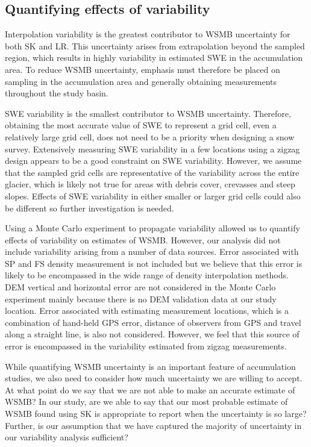 \documentclass[twocolumn,letterpaper]{igs}
\begin{document}


\subsection{Quantifying effects of variability}

Interpolation variability is the greatest contributor to WSMB uncertainty for both SK and LR. This uncertainty arises from extrapolation beyond the sampled region, which results in highly variability in estimated SWE in the accumulation area. To reduce WSMB uncertainty, emphasis must therefore be placed on sampling in the accumulation area and generally obtaining measurements throughout the study basin. 

SWE variability is the smallest contributor to WSMB uncertainty. Therefore, obtaining the most accurate value of SWE to represent a grid cell, even a relatively large grid cell, does not need to be a priority when designing a snow survey. Extensively measuring SWE variability in a few locations using a zigzag design appears to be a good constraint on SWE variability. However, we assume that the sampled grid cells are representative of the variability across the entire glacier, which is likely not true for areas with debris cover, crevasses and steep slopes. Effects of SWE variability in either smaller or larger grid cells could also be different so further investigation is needed.

Using a Monte Carlo experiment to propagate variability allowed us to quantify effects of variability on estimates of WSMB. However, our analysis did not include variability arising from a number of data sources. Error associated with SP and FS density measurement is not included but we believe that this error is likely to be encompassed in the wide range of density interpolation methods. DEM vertical and horizontal error are not considered in the Monte Carlo experiment mainly because there is no DEM validation data at our study location. Error associated with estimating measurement locations, which is a combination of hand-held GPS error, distance of observers from GPS and travel along a straight line, is also not considered. However, we feel that this source of error is encompassed in the variability estimated from zigzag measurements. 

While quantifying WSMB uncertainty is an important feature of accumulation studies, we also need to consider how much uncertainty we are willing to accept. At what point do we say that we are not able to make an accurate estimate of WSMB? In our study, are we able to say that our most probable estimate of WSMB found using SK is appropriate to report when the uncertainty is so large? Further, is our assumption that we have captured the majority of uncertainty in our variability analysis sufficient? 
\end{document}
